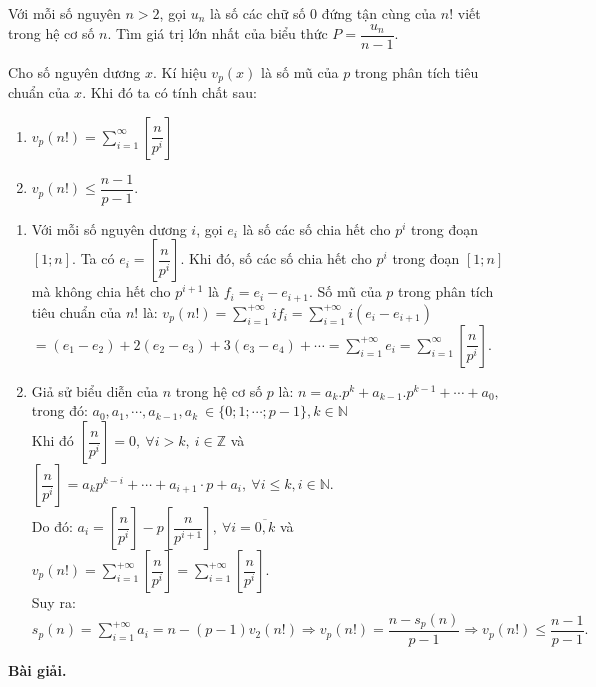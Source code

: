 \begin{bt}%
Với mỗi số nguyên $n>2$, gọi $u_n$ là số các chữ số $0$ đứng tận cùng của $n!$ viết trong hệ cơ số $n$. Tìm giá trị lớn nhất của biểu thức $P=\dfrac{u_n}{n-1}.$
\loigiai
{
\begin{dl}
Cho số nguyên dương $x$. Kí hiệu $v_p(x)$ là số mũ của $p$ trong phân tích tiêu chuẩn của $x$. Khi đó ta có tính chất sau:
\begin{enumerate}[1)]
\item $v_p(n!)=\displaystyle \sum_{i=1}^\infty\left[\dfrac{n}{p^i}\right]$
\item $v_p(n!)\leq \dfrac{n-1}{p-1}.$
\end{enumerate}
\begin{cm}\hfill
\begin{enumerate}[1)]
\item Với mỗi số nguyên dương $i$, gọi $e_i$ là số các số chia hết cho $p^i$ trong đoạn $[1;n]$. Ta có $e_i=\left[\dfrac{n}{p^i}\right].$ Khi đó, số các số chia hết cho $p^i$ trong đoạn $[1;n]$ mà không chia hết cho $p^{i+1}$ là $f_i=e_i-e_{i+1}.$ Số mũ của $p$ trong phân tích tiêu chuẩn của $n!$ là: $v_p(n!)=\displaystyle \sum_{i=1}^{+\infty}if_i=\displaystyle \sum_{i=1}^{+\infty}i(e_i-e_{i+1})$\\
$=(e_1-e_2)+2(e_2-e_3)+3(e_3-e_4)+\cdots=\displaystyle \sum_{i=1}^{+\infty}e_i=\displaystyle \sum_{i=1}^\infty\left[\dfrac{n}{p^i}\right]$.
\item Giả sử biểu diễn của $n$ trong hệ cơ số $p$ là: $n=a_k.p^k+a_{k-1}.p^{k-1}+\cdots+a_0,$ trong đó: $a_0,a_1,\cdots,a_{k-1},a_k\ \in \{0;1;\cdots;p-1\},k\in\mathbb{N}$\\
Khi đó $\left[\dfrac{n}{p^i}\right]=0,\ \forall i>k,\ i\in\mathbb{Z}$ và $\left[\dfrac{n}{p^i}\right]=a_kp^{k-i}+\cdots+a_{i+1}\cdot p+a_i,\ \forall i\leq k,i\in\mathbb{N}.$\\
Do đó: $a_i=\left[\dfrac{n}{p^i}\right]-p\left[\dfrac{n}{p^{i+1}}\right],\ \forall i=\overline{0,k}$ và $v_p(n!)=\displaystyle \sum_{i=1}^{+\infty}\left[\dfrac{n}{p^i}\right]=\displaystyle \sum_{i=1}^{+\infty}\left[\dfrac{n}{p^i}\right].$\\
Suy ra: $s_p(n)=\displaystyle \sum_{i=1}^{+\infty}a_i=n-(p-1)v_2(n!)\Rightarrow v_p(n!)=\dfrac{n-s_p(n)}{p-1} \Rightarrow v_p(n!)\leq \dfrac{n-1}{p-1}.$
\end{enumerate}
\end{cm}
\end{dl}
\textbf{Bài giải.}
}
\end{bt}
